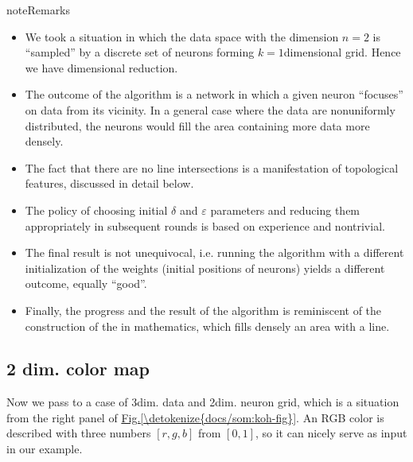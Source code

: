 \documentclass[letterpaper,10pt,english]{jupyterBook}
\begin{document}
\begin{sphinxadmonition}{note}{Remarks}
\begin{itemize}
\item {} 
\sphinxAtStartPar
We took a situation in which the data space with the dimension \(n = 2\) is “sampled” by a discrete set of neurons forming  \(k=1\)\sphinxhyphen{}dimensional grid. Hence we have dimensional reduction.

\item {} 
\sphinxAtStartPar
The outcome of the algorithm is a network in which a given neuron “focuses” on data from its vicinity. In a general case where the data are non\sphinxhyphen{}uniformly distributed, the neurons would fill the area containing more data more densely.

\item {} 
\sphinxAtStartPar
The fact that there are no line intersections is a manifestation of topological features, discussed in detail below.

\item {} 
\sphinxAtStartPar
The policy of choosing initial \(\delta\) and \(\varepsilon \) parameters and reducing them appropriately in subsequent rounds is based on experience and non\sphinxhyphen{}trivial.

\item {} 
\sphinxAtStartPar
The final result is not unequivocal, i.e. running the algorithm with a different initialization of the weights (initial positions of neurons) yields a different outcome, equally “good”.

\item {} 
\sphinxAtStartPar
Finally, the progress and the result of the algorithm is reminiscent of the construction of the  in mathematics, which fills densely an area with a line.

\end{itemize}
\end{sphinxadmonition}


\subsection{2 dim. color map}
\label{\detokenize{docs/som:dim-color-map}}
\sphinxAtStartPar
Now we pass to a case of 3\sphinxhyphen{}dim. data and 2\sphinxhyphen{}dim. neuron grid, which is a situation from the right panel of \hyperref[\detokenize{docs/som:koh-fig}]{Fig.\@ \ref{\detokenize{docs/som:koh-fig}}}. An RGB color is described with three numbers \([r,g,b]\) from \([0,1]\), so it can nicely serve as input in our example.
\end{document}
